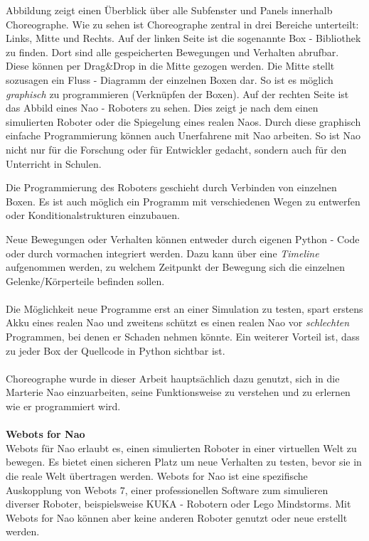 Abbildung  zeigt einen Überblick über alle Subfenster und Panels innerhalb Choreographe. Wie zu sehen ist Choreographe zentral in drei Bereiche unterteilt: Links, Mitte und Rechts.
Auf der linken Seite ist die sogenannte Box - Bibliothek zu finden. Dort sind alle gespeicherten Bewegungen und Verhalten abrufbar. Diese können per Drag\&Drop in die Mitte gezogen werden. Die Mitte stellt sozusagen ein Fluss - Diagramm der einzelnen Boxen dar. So ist es möglich \textit{graphisch} zu programmieren (Verknüpfen der Boxen). Auf der rechten Seite ist das Abbild eines Nao - Roboters zu sehen. Dies zeigt je nach dem einen simulierten Roboter oder die Spiegelung eines realen Naos. 
Durch diese graphisch einfache Programmierung können auch Unerfahrene mit Nao arbeiten. So ist Nao nicht nur für die Forschung oder für Entwickler gedacht, sondern auch für den Unterricht in Schulen.

Die Programmierung des Roboters geschieht durch Verbinden von einzelnen Boxen. Es ist auch möglich ein Programm mit verschiedenen Wegen zu entwerfen oder Konditionalstrukturen einzubauen.

Neue Bewegungen oder Verhalten können entweder durch eigenen Python - Code oder durch vormachen integriert werden. Dazu kann über eine \textit{Timeline} aufgenommen werden, zu welchem Zeitpunkt der Bewegung sich die einzelnen Gelenke/Körperteile befinden sollen.
\\
\\
Die Möglichkeit neue Programme erst an einer Simulation zu testen, spart erstens Akku eines realen Nao und zweitens schützt es einen realen Nao vor \textit{schlechten} Programmen, bei denen er Schaden nehmen könnte. Ein weiterer Vorteil ist, dass zu jeder Box der Quellcode in Python sichtbar ist.
\\
\\
Choreographe wurde in dieser Arbeit hauptsächlich dazu genutzt, sich in die Marterie Nao einzuarbeiten, seine Funktionsweise zu verstehen und zu erlernen wie er programmiert wird.
\\
\\
\textbf{Webots for Nao}
\\
Webots für Nao erlaubt es, einen simulierten Roboter in einer virtuellen Welt zu bewegen. Es bietet einen sicheren Platz um neue Verhalten zu testen, bevor sie in die reale Welt übertragen werden. Webots for Nao ist eine spezifische Auskopplung von Webots 7, einer professionellen Software zum simulieren diverser Roboter, beispielsweise KUKA - Robotern oder Lego Mindstorms. Mit Webots for Nao können aber keine anderen Roboter genutzt oder neue erstellt werden.

